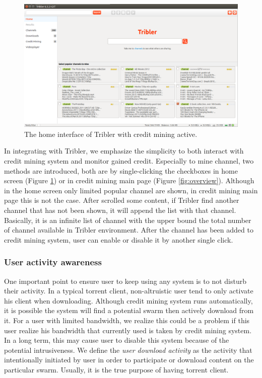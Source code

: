 \begin{figure}
	\includegraphics[width=\textwidth]{pics/home_channel.png}
	\caption{The home interface of Tribler with credit mining active.}
	\label{fig:homecm}
\end{figure}

In integrating with Tribler, we emphasize the simplicity to both interact with credit mining system and monitor gained credit. Especially to mine channel, two methods are introduced, both are by single-clicking the checkboxes in home screen (Figure \ref{fig:homecm}) or in credit mining main page (Figure \ref{fig:overview}). Although in the home screen only limited popular channel are shown, in credit mining main page this is not the case. After scrolled some content, if Tribler find another channel that has not been shown, it will append the list with that channel. Basically, it is an infinite list of channel with the upper bound the total number of channel available in Tribler environment. After the channel has been added to credit mining system, user can enable or disable it by another single click.

\subsubsection{User activity awareness}
One important point to ensure user to keep using any system is to not disturb their activity. In a typical torrent client, non-altruistic user tend to only activate his client when downloading. Although credit mining system runs automatically, it is possible the system will find a potential swarm then actively download from it. For a user with limited bandwidth, we realize this could be a problem if this user realize his bandwidth that currently used is taken by credit mining system. In a long term, this may cause user to disable this system because of the potential intrusiveness. We define the \textit{user download activity} as the activity that intentionally initiated by user in order to participate or download content on the particular swarm. Usually, it is the true purpose of having torrent client. 

